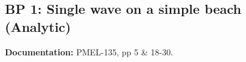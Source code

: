 \newsection
\subsection{BP 1:
  Single wave on a simple beach (Analytic)}

{\bf Documentation:}  PMEL-135, pp 5 \& 18-30.

